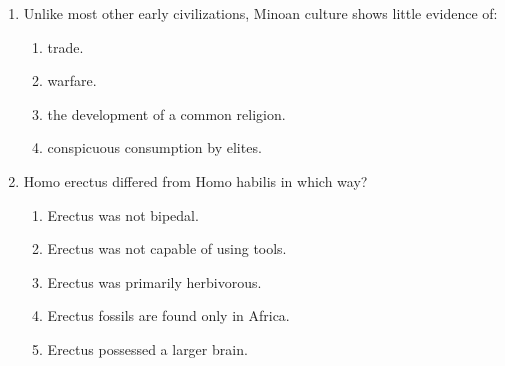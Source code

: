 \documentclass[12pt]{article}
\begin{document}
\begin{enumerate}[label=\arabic*.]
\begin{enumerate}[label=(\alph*)]
\end{enumerate}
\item Unlike most other early civilizations, Minoan culture shows little evidence of:
\begin{enumerate}[label=(\alph*)]
    \item trade.
    \item warfare.
    \item the development of a common religion.
    \item conspicuous consumption by elites.
\end{enumerate}
\item Homo erectus differed from Homo habilis in which way?
\begin{enumerate}[label=(\alph*)]
    \item Erectus was not bipedal.
    \item Erectus was not capable of using tools.
    \item Erectus was primarily herbivorous.
    \item Erectus fossils are found only in Africa.
    \item Erectus possessed a larger brain.
\end{enumerate}
\end{enumerate}
\end{document}
